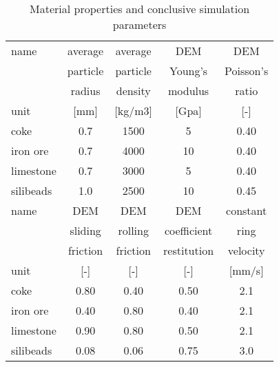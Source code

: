 \begin{table}[htbp]
  \centering
  \caption{Material properties and conclusive simulation parameters}
    \begin{tabular}{|lcccc|}
	\hline
    name  & average & average & DEM   & DEM \\
          & particle & particle & Young's & Poisson's \\
          & radius & density & modulus & ratio \\
    unit  & [mm]  & [kg/m3] & [Gpa] & [-] \\
	\hline
    coke  & 0.7   & 1500  & 5     & 0.40 \\
    iron ore & 0.7   & 4000  & 10    & 0.40 \\
    limestone & 0.7   & 3000  & 5     & 0.40 \\
    silibeads & 1.0 & 2500 & 10 & 0.45 \\
 	\hline
    name  & DEM   & DEM   & DEM   & constant \\
          & sliding & rolling & coefficient & ring \\
          & friction & friction & restitution & velocity \\
    unit  & [-]   & [-]   & [-]   & [mm/s] \\
	\hline
    coke  & 0.80  & 0.40  & 0.50   & 2.1 \\
    iron ore & 0.40  & 0.80  & 0.40   & 2.1 \\
    limestone & 0.90  & 0.80  & 0.50   & 2.1 \\
    silibeads & 0.08  & 0.06  & 0.75  & 3.0 \\
	\hline
    \end{tabular}%
  \label{tab:tableprop}%
\end{table}%
